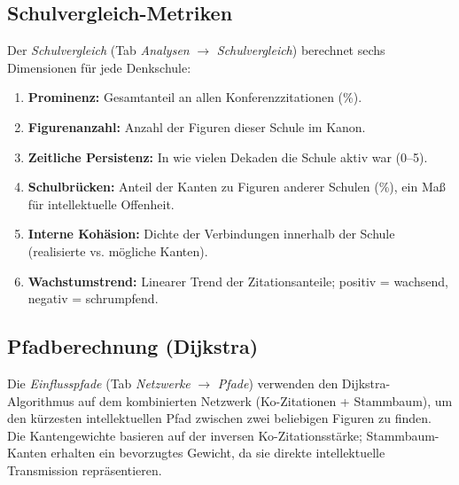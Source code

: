 \documentclass[11pt,a4paper,twoside]{article}
\begin{document}
\subsection{Schulvergleich-Metriken}
Der \textit{Schulvergleich} (Tab \textit{Analysen} $\rightarrow$ \textit{Schulvergleich}) berechnet sechs Dimensionen für jede Denkschule:
\begin{enumerate}[leftmargin=*,itemsep=2pt,topsep=2pt]
    \item \textbf{Prominenz:} Gesamtanteil an allen Konferenzzitationen (\%).
    \item \textbf{Figurenanzahl:} Anzahl der Figuren dieser Schule im Kanon.
    \item \textbf{Zeitliche Persistenz:} In wie vielen Dekaden die Schule aktiv war (0--5).
    \item \textbf{Schulbrücken:} Anteil der Kanten zu Figuren anderer Schulen (\%), ein Maß für intellektuelle Offenheit.
    \item \textbf{Interne Kohäsion:} Dichte der Verbindungen innerhalb der Schule (realisierte vs. mögliche Kanten).
    \item \textbf{Wachstumstrend:} Linearer Trend der Zitationsanteile; positiv = wachsend, negativ = schrumpfend.
\end{enumerate}

\subsection{Pfadberechnung (Dijkstra)}
Die \textit{Einflusspfade} (Tab \textit{Netzwerke} $\rightarrow$ \textit{Pfade}) verwenden den Dijkstra-Algorithmus auf dem kombinierten Netzwerk (Ko-Zitationen + Stammbaum), um den kürzesten intellektuellen Pfad zwischen zwei beliebigen Figuren zu finden. Die Kantengewichte basieren auf der inversen Ko-Zitationsstärke; Stammbaum-Kanten erhalten ein bevorzugtes Gewicht, da sie direkte intellektuelle Transmission repräsentieren.
\end{document}
